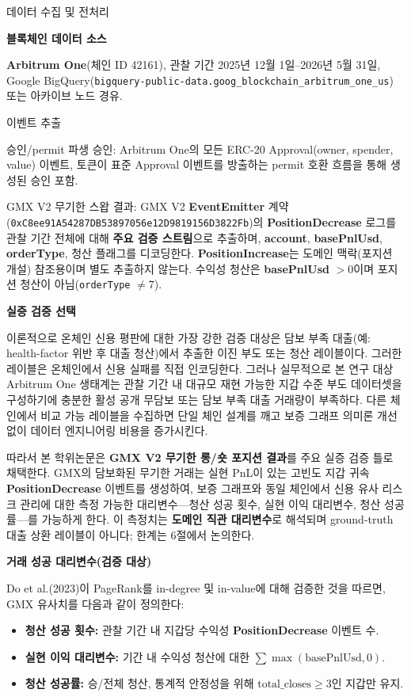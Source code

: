 데이터 수집 및 전처리


\textbf{블록체인 데이터 소스}


\textbf{Arbitrum One}(체인 ID 42161), 관찰 기간 2025년 12월 1일--2026년 5월 31일, Google BigQuery(\texttt{bigquery-public-data.goog\_blockchain\_arbitrum\_one\_us}) 또는 아카이브 노드 경유.


이벤트 추출


승인/permit 파생 승인: Arbitrum One의 모든 ERC-20 Approval(owner, spender, value) 이벤트, 토큰이 표준 Approval 이벤트를 방출하는 permit 호환 흐름을 통해 생성된 승인 포함.


GMX V2 무기한 스왑 결과: GMX V2 \textbf{EventEmitter} 계약(\texttt{0xC8ee91A54287DB53897056e12D9819156D3822Fb})의 \textbf{PositionDecrease} 로그를 관찰 기간 전체에 대해 \textbf{주요 검증 스트림}으로 추출하며, \textbf{account}, \textbf{basePnlUsd}, \textbf{orderType}, 청산 플래그를 디코딩한다. \textbf{PositionIncrease}는 도메인 맥락(포지션 개설) 참조용이며 별도 추출하지 않는다. 수익성 청산은 \textbf{basePnlUsd} $> 0$이며 포지션 청산이 아님(\texttt{orderType} $\neq 7$).


\textbf{실증 검증 선택}


이론적으로 온체인 신용 평판에 대한 가장 강한 검증 대상은 담보 부족 대출(예: health-factor 위반 후 대출 청산)에서 추출한 이진 부도 또는 청산 레이블이다. 그러한 레이블은 온체인에서 신용 실패를 직접 인코딩한다. 그러나 실무적으로 본 연구 대상 Arbitrum One 생태계는 관찰 기간 내 대규모 재현 가능한 지갑 수준 부도 데이터셋을 구성하기에 충분한 활성 공개 무담보 또는 담보 부족 대출 거래량이 부족하다. 다른 체인에서 비교 가능 레이블을 수집하면 단일 체인 설계를 깨고 보증 그래프 의미론 개선 없이 데이터 엔지니어링 비용을 증가시킨다.


따라서 본 학위논문은 \textbf{GMX V2 무기한 롱/숏 포지션 결과}를 주요 실증 검증 틀로 채택한다. GMX의 담보화된 무기한 거래는 실현 PnL이 있는 고빈도 지갑 귀속 \textbf{PositionDecrease} 이벤트를 생성하여, 보증 그래프와 동일 체인에서 신용 유사 리스크 관리에 대한 측정 가능한 대리변수---청산 성공 횟수, 실현 이익 대리변수, 청산 성공률---를 가능하게 한다. 이 측정치는 \textbf{도메인 직관 대리변수}로 해석되며 ground-truth 대출 상환 레이블이 아니다; 한계는 6절에서 논의한다.


\textbf{거래 성공 대리변수(검증 대상)}


Do et al.(2023)이 PageRank를 in-degree 및 in-value에 대해 검증한 것을 따르면, GMX 유사치를 다음과 같이 정의한다:

\begin{itemize}
\item[\textbullet] \textbf{청산 성공 횟수:} 관찰 기간 내 지갑당 수익성 \textbf{PositionDecrease} 이벤트 수.
\item[\textbullet] \textbf{실현 이익 대리변수:} 기간 내 수익성 청산에 대한 $\sum \max(\text{basePnlUsd}, 0)$.
\item[\textbullet] \textbf{청산 성공률:} 승/전체 청산, 통계적 안정성을 위해 $\text{total\_closes} \geq 3$인 지갑만 유지.
\end{itemize}


